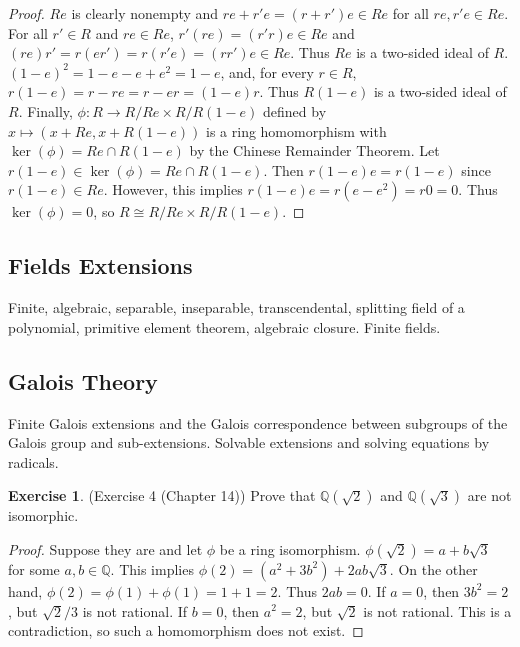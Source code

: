 \documentclass[12pt, psamsfonts]{amsart}
\theoremstyle{definition}
\newtheorem*{exer}{Exercise}
\theoremstyle{remark}
\numberwithin{equation}{section}
\begin{document}
\begin{proof}
  $Re$ is clearly nonempty and $re + r'e = (r + r')e \in Re$ for all $re, r'e \in Re$.
  For all $r' \in R$ and $re \in Re$, $r'(re) = (r'r)e \in Re$ and $(re)r' = r(er') = r(r'e) = (rr')e \in Re$.
  Thus $Re$ is a two-sided ideal of $R$.
  $(1 - e)^2 = 1 - e - e + e^2 = 1 - e$, and, for every $r \in R$, $r(1 - e) = r - re = r - er = (1 - e)r$.
  Thus $R(1 - e)$ is a two-sided ideal of $R$.
  Finally, $\phi: R \rightarrow R / Re \times R / R(1 - e)$ defined by $x \mapsto (x + Re, x + R(1 - e))$ is a ring homomorphism with $\ker(\phi) = Re \cap R(1 - e)$ by the Chinese Remainder Theorem.
  Let $r(1 - e) \in \ker(\phi) = Re \cap R(1 - e)$.
  Then $r(1 - e)e = r(1 - e)$ since $r(1 - e) \in Re$.
  However, this implies $r(1 - e)e = r(e - e^2) = r0 = 0$.
  Thus $\ker(\phi) = 0$, so $R \cong R / Re \times R / R(1 - e)$.
\end{proof}


\subsection{Fields Extensions}
Finite, algebraic, separable, inseparable, transcendental, splitting field of a polynomial, primitive element theorem, algebraic closure.
Finite fields.

\subsection{Galois Theory}
Finite Galois extensions and the Galois correspondence between subgroups of the Galois group and sub-extensions.
Solvable extensions and solving equations by radicals.

\begin{exer}{(Exercise 4 (Chapter 14))}
  Prove that $\mathbb{Q}(\sqrt{2})$ and $\mathbb{Q}(\sqrt{3})$ are not isomorphic.
\end{exer}

\begin{proof}
  Suppose they are and let $\phi$ be a ring isomorphism.
  $\phi(\sqrt{2}) = a + b\sqrt{3}$ for some $a, b \in \mathbb{Q}$.
  This implies $\phi(2) = (a^2 + 3b^2) + 2ab\sqrt{3}$.
  On the other hand, $\phi(2) = \phi(1) + \phi(1) = 1 + 1 = 2$.
  Thus $2ab = 0$.
  If $a = 0$, then $3b^2 = 2$, but $\sqrt{2}/3$ is not rational.
  If $b = 0$, then $a^2 = 2$, but $\sqrt{2}$ is not rational.
  This is a contradiction, so such a homomorphism does not exist.
\end{proof}
\end{document}

